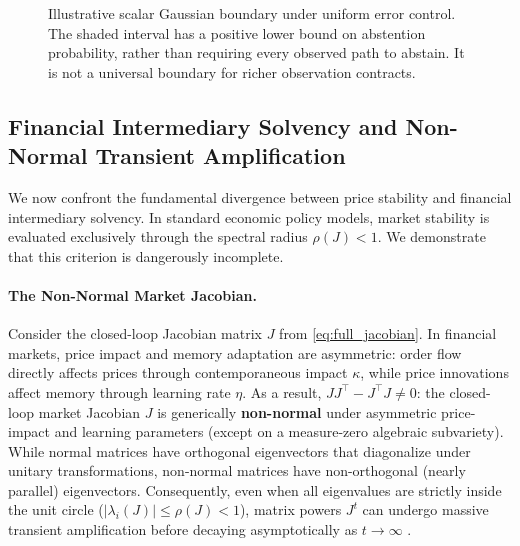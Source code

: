 \documentclass[12pt]{article}
\theoremstyle{definition}
\theoremstyle{remark}
\begin{document}
\begin{figure}[tbp]
\centering
{}
\caption{Illustrative scalar Gaussian boundary under uniform error control. The shaded interval has a positive lower bound on abstention probability, rather than requiring every observed path to abstain. It is not a universal boundary for richer observation contracts.}
\label{fig:abstention_zone}
\end{figure}
\subsection{Financial Intermediary Solvency and Non-Normal Transient Amplification}
We now confront the fundamental divergence between price stability and financial intermediary solvency. In standard economic policy models, market stability is evaluated exclusively through the spectral radius $\rho(J) < 1$. We demonstrate that this criterion is dangerously incomplete.

\paragraph{The Non-Normal Market Jacobian.}
Consider the closed-loop Jacobian matrix $J$ from \eqref{eq:full_jacobian}. In financial markets, price impact and memory adaptation are asymmetric: order flow directly affects prices through contemporaneous impact $\kappa$, while price innovations affect memory through learning rate $\eta$. As a result, $J J^\top - J^\top J \neq 0$: the closed-loop market Jacobian $J$ is generically \textbf{non-normal} under asymmetric price-impact and learning parameters (except on a measure-zero algebraic subvariety). While normal matrices have orthogonal eigenvectors that diagonalize under unitary transformations, non-normal matrices have non-orthogonal (nearly parallel) eigenvectors. Consequently, even when all eigenvalues are strictly inside the unit circle ($|\lambda_i(J)| \le \rho(J) < 1$), matrix powers $J^t$ can undergo massive transient amplification before decaying asymptotically as $t \to \infty$ \citep{trefethen2005spectra}.
\end{document}
